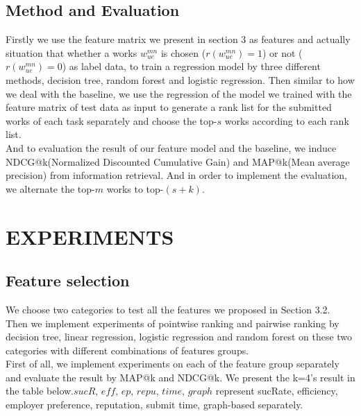 \subsection{Method and Evaluation}
Firstly we use the feature matrix we present in section 3 as features and actually situation that whether a works ${w}_{ue}^{mn}$ is chosen ($r({w}_{ue}^{mn})=1$) or not ($r({w}_{ue}^{mn})=0$) as label data, to train a regression model by three different methods, decision tree, random forest and logistic regression. Then similar to how we deal with the baseline, we use the regression of the model we trained with the feature matrix of test data as input to generate a rank list for the submitted works of each task separately and choose the top-$s$ works according to each rank list.\\

And to evaluation the result of our feature model and the baseline, we induce NDCG@k(Normalized Discounted Cumulative Gain) and MAP@k(Mean average precision) from information retrieval. And in order to implement the evaluation, we alternate the top-$m$ works to top-$(s+k)$.

\section{EXPERIMENTS}
\subsection{Feature selection}
We choose two categories to test all the features we proposed in Section 3.2. Then we implement experiments of pointwise ranking and pairwise ranking by decision tree, linear regression, logistic regression and random forest on these two categories with different combinations of features groups. \\
First of all, we implement experiments on each of the feature group separately and evaluate the result by MAP@k and NDCG@k. We present the k=4's result in the table below.$sucR$, $eff$, $ep$, $repu$, $time$, $graph$ represent sucRate, efficiency, employer preference, reputation, submit time, graph-based separately. \\

